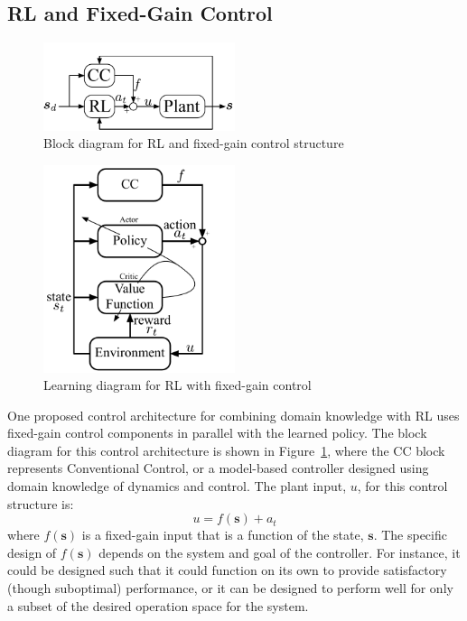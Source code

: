 \subsection{RL and Fixed-Gain Control}
%
\begin{figure}[tb]
    \begin{center}
    \includegraphics[width = 0.5\textwidth]{figures/figures_RL_model_based_control/Block_diagram_combined_control.pdf}
    \caption{Block diagram for RL and fixed-gain control structure} 
    \label{fig_chap2:fixed_gain_block_diagram}
    \end{center}
    \end{figure}
    \begin{figure}[tb]
    \begin{center}
    \includegraphics[width = 0.5\textwidth]{figures/figures_RL_model_based_control/Actor_Critic_diagram_fixed_gain.pdf}
    \caption{Learning diagram for RL with fixed-gain control} 
    \label{fig_chap2:fixed_gain_actor_critic}
    \end{center}
    \end{figure}
One proposed control architecture for combining domain knowledge with RL uses fixed-gain control components in parallel with the learned policy. The block diagram for this control architecture is shown in Figure~\ref{fig_chap2:fixed_gain_block_diagram}, where the CC block represents Conventional Control, or a model-based controller designed using domain knowledge of dynamics and control. The plant input, $u$, for this control structure is:
%
\begin{equation}
u=f(\boldsymbol{s}) + a_t
\label{eq_chap2:fixed_RL_block_diagram}
\end{equation}
%
where $f(\boldsymbol{s})$ is a fixed-gain input that is a function of the state, $\boldsymbol{s}$.
The specific design of $f(\boldsymbol{s})$ depends on the system and goal of the controller.
%
For instance, it could be designed such that it could function on its own to provide satisfactory (though suboptimal) performance, or it can be designed to perform well for only a subset of the desired operation space for the system.


